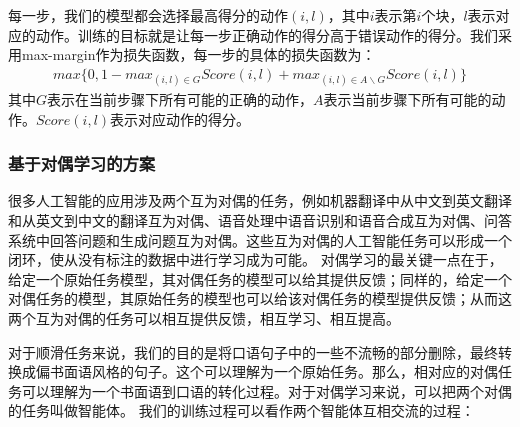 
每一步，我们的模型都会选择最高得分的动作$(i,l)$，其中$i$表示第$i$个块，$l$表示对应的动作。训练的目标就是让每一步正确动作的得分高于错误动作的得分。我们采用max-margin作为损失函数，每一步的具体的损失函数为：
   \begin{equation}
   \begin{split}
   max\{0, 1-max_{(i,l) \in {G}}Score(i,l) + max_{(i,l) \in {A\backslash G}}Score(i,l)\}
   \end{split}
   \end{equation}
   其中$G$表示在当前步骤下所有可能的正确的动作，$A$表示当前步骤下所有可能的动作。$Score(i,l)$表示对应动作的得分。


\subsubsection{基于对偶学习的方案}

很多人工智能的应用涉及两个互为对偶的任务，例如机器翻译中从中文到英文翻译和从英文到中文的翻译互为对偶、语音处理中语音识别和语音合成互为对偶、问答系统中回答问题和生成问题互为对偶。这些互为对偶的人工智能任务可以形成一个闭环，使从没有标注的数据中进行学习成为可能。
对偶学习的最关键一点在于，给定一个原始任务模型，其对偶任务的模型可以给其提供反馈；同样的，给定一个对偶任务的模型，其原始任务的模型也可以给该对偶任务的模型提供反馈；从而这两个互为对偶的任务可以相互提供反馈，相互学习、相互提高。

对于顺滑任务来说，我们的目的是将口语句子中的一些不流畅的部分删除，最终转换成偏书面语风格的句子。这个可以理解为一个原始任务。那么，相对应的对偶任务可以理解为一个书面语到口语的转化过程。对于对偶学习来说，可以把两个对偶的任务叫做智能体。
我们的训练过程可以看作两个智能体互相交流的过程：

